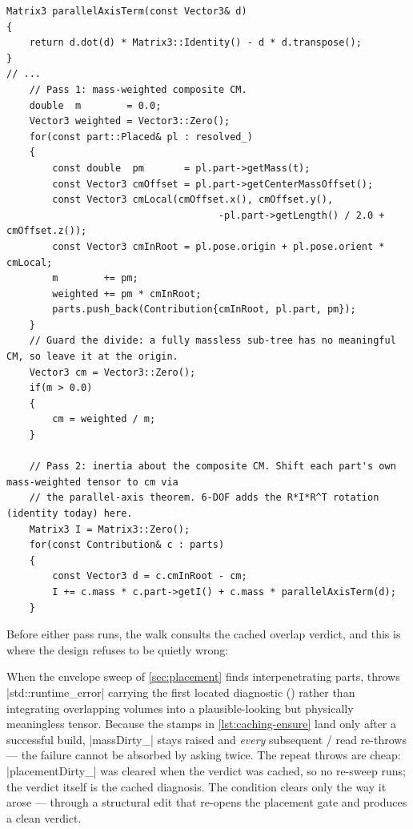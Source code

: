 \begin{listing}[htbp]
\begin{verbatim}
Matrix3 parallelAxisTerm(const Vector3& d)
{
    return d.dot(d) * Matrix3::Identity() - d * d.transpose();
}
// ...
    // Pass 1: mass-weighted composite CM.
    double  m        = 0.0;
    Vector3 weighted = Vector3::Zero();
    for(const part::Placed& pl : resolved_)
    {
        const double  pm       = pl.part->getMass(t);
        const Vector3 cmOffset = pl.part->getCenterMassOffset();
        const Vector3 cmLocal(cmOffset.x(), cmOffset.y(),
                                     -pl.part->getLength() / 2.0 + cmOffset.z());
        const Vector3 cmInRoot = pl.pose.origin + pl.pose.orient * cmLocal;
        m        += pm;
        weighted += pm * cmInRoot;
        parts.push_back(Contribution{cmInRoot, pl.part, pm});
    }
    // Guard the divide: a fully massless sub-tree has no meaningful CM, so leave it at the origin.
    Vector3 cm = Vector3::Zero();
    if(m > 0.0)
    {
        cm = weighted / m;
    }

    // Pass 2: inertia about the composite CM. Shift each part's own mass-weighted tensor to cm via
    // the parallel-axis theorem. 6-DOF adds the R*I*R^T rotation (identity today) here.
    Matrix3 I = Matrix3::Zero();
    for(const Contribution& c : parts)
    {
        const Vector3 d = c.cmInRoot - cm;
        I += c.mass * c.part->getI() + c.mass * parallelAxisTerm(d);
    }
\end{verbatim}
\caption{The two-pass composite walk (, elided). The
massless-subtree guard keeps a zero-mass assembly --- legal while sketching a design --- from
producing a $0/0$ CM; it reads as the origin instead.}\label{lst:caching-passes}
\end{listing}

Before either pass runs, the walk consults the cached overlap verdict, and this is where the
design refuses to be quietly wrong:

\begin{hardfail}
When the envelope sweep of \cref{sec:placement} finds interpenetrating parts,
 throws \cppinline|std::runtime_error| carrying the first located
diagnostic () rather than integrating overlapping volumes into
a plausible-looking but physically meaningless tensor. Because the stamps in
\cref{lst:caching-ensure} land only after a successful build, \cppinline|massDirty_| stays raised
and \emph{every} subsequent / read re-throws --- the failure
cannot be absorbed by asking twice. The repeat throws are cheap: \cppinline|placementDirty_| was
cleared when the verdict was cached, so no re-sweep runs; the verdict itself is the cached
diagnosis. The condition clears only the way it arose --- through a structural edit that re-opens
the placement gate and produces a clean verdict.
\end{hardfail}

